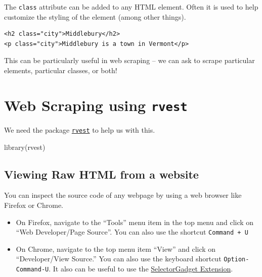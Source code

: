 \documentclass[
  letterpaper,
  DIV=11,
  numbers=noendperiod]{scrartcl}
\newenvironment{Shaded}{\begin{snugshade}}{\end{snugshade}}
\newcommand{\FunctionTok}[1]{\textcolor[rgb]{0.28,0.35,0.67}{#1}}
\newcommand{\NormalTok}[1]{\textcolor[rgb]{0.00,0.23,0.31}{#1}}
\providecommand{\tightlist}{%
  \setlength{\itemsep}{0pt}\setlength{\parskip}{0pt}}\usepackage{longtable,booktabs,array}
\begin{document}
The \texttt{class} attribute can be added to any HTML element. Often it
is used to help customize the styling of the element (among other
things).

\begin{verbatim}
<h2 class="city">Middlebury</h2>
<p class="city">Middlebury is a town in Vermont</p>
\end{verbatim}

This can be particularly useful in web scraping -- we can ask to scrape
particular elements, particular classes, or both!

\hypertarget{web-scraping-using-rvest}{%
\section{\texorpdfstring{Web Scraping using
\texttt{rvest}}{Web Scraping using rvest}}\label{web-scraping-using-rvest}}

We need the package \href{https://rvest.tidyverse.org/}{\texttt{rvest}}
to help us with this.

\begin{Shaded}
\begin{Highlighting}[]
\FunctionTok{library}\NormalTok{(rvest)}
\end{Highlighting}
\end{Shaded}

\hypertarget{viewing-raw-html-from-a-website}{%
\subsection{Viewing Raw HTML from a
website}\label{viewing-raw-html-from-a-website}}

You can inspect the source code of any webpage by using a web browser
like Firefox or Chrome.

\begin{itemize}
\tightlist
\item
  On Firefox, navigate to the ``Tools'' menu item in the top menu and
  click on ``Web Developer/Page Source''. You can also use the shortcut
  \texttt{Command\ +\ U}
\item
  On Chrome, navigate to the top menu item ``View'' and click on
  ``Developer/View Source.'' You can also use the keyboard shortcut
  \texttt{Option-Command-U}. It also can be useful to use the
  \href{https://chrome.google.com/webstore/detail/selectorgadget/mhjhnkcfbdhnjickkkdbjoemdmbfginb/related}{SelectorGadget
  Extension}.
\end{itemize}
\end{document}
